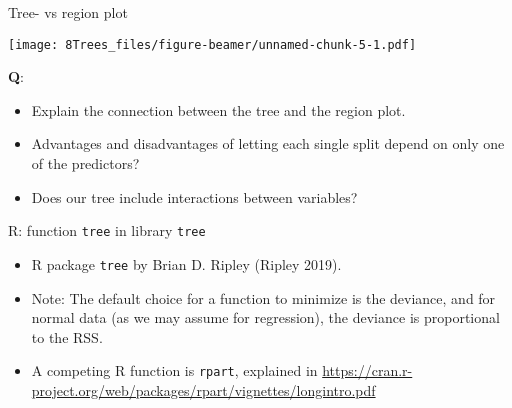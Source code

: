 \documentclass[10pt,ignorenonframetext,]{beamer}
\providecommand{\tightlist}{%
  \setlength{\itemsep}{0pt}\setlength{\parskip}{0pt}}
\begin{document}
\begin{frame}

\begin{block}{Tree- vs region plot}

\vspace{2mm}

\texttt{[image: 8Trees\_files/figure-beamer/unnamed-chunk-5-1.pdf]}

\vspace{-2mm}

\textbf{Q}:

\begin{itemize}
\tightlist
\item
  Explain the connection between the tree and the region plot.
\item
  Advantages and disadvantages of letting each single split depend on
  only one of the predictors?
\item
  Does our tree include interactions between variables?
\end{itemize}

\end{block}

\end{frame}

\begin{frame}[fragile]

\begin{block}{R: function \texttt{tree} in library \texttt{tree}}

\vspace{2mm}

\begin{itemize}
\tightlist
\item
  R package \texttt{tree} by Brian D. Ripley (Ripley 2019).
\end{itemize}

\vspace{2mm}

\begin{itemize}
\tightlist
\item
  Note: The default choice for a function to minimize is the deviance,
  and for normal data (as we may assume for regression), the deviance is
  proportional to the RSS.
\end{itemize}

\vspace{2mm}

\begin{itemize}
\tightlist
\item
  A competing R function is \texttt{rpart}, explained in
  \url{https://cran.r-project.org/web/packages/rpart/vignettes/longintro.pdf}
\end{itemize}

\end{block}

\end{frame}
\end{document}
